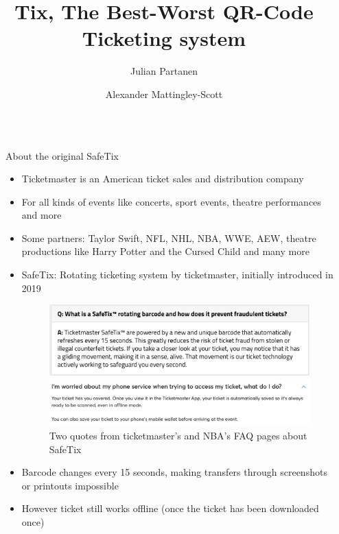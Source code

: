\documentclass[final,dvipsnames]{beamer}
\title{\soutverythick{Safe}Tix, The Best-Worst QR-Code Ticketing system}
\author{ Julian Partanen \inst{1} \and Alexander Mattingley-Scott \inst{1}}
\institute[shortinst]{\inst{1} Heidelberg University}
\newlength{\sepwidth}
\newlength{\colwidth}
\newcommand{\separatorcolumn}{\begin{column}{\sepwidth}\end{column}}
\begin{document}
\begin{frame}[t, fragile]
\begin{columns}[t]
\separatorcolumn

\begin{column}{\colwidth}

    \begin{block}{About the original SafeTix}
        \begin{itemize}
            \item Ticketmaster is an American ticket sales and distribution company \cite{ticketmaster_wikipedia}
            \item For all kinds of events like concerts, sport events, theatre performances and more \cite{ticketmaster_wikipedia}
            \item Some partners: Taylor Swift, NFL, NHL, NBA, WWE, AEW, theatre productions like Harry Potter and the Cursed Child and many more \cite{ticketmaster_wikipedia}
            \item SafeTix: Rotating ticketing system by ticketmaster, initially introduced in 2019 \cite{introducing_safetix} \cite{ticketmaster_safetix_faq} \cite{nba_safetix_faq}
            \begin{figure}[h]
                \begin{center}
                    \includegraphics[width=\textwidth]{figures/SafeTix_Quote_1.png}
                \end{center}
                \begin{center}
                    \includegraphics[width=\textwidth]{figures/SafeTix_Quote_2.png}
                \end{center}
                \caption{Two quotes from ticketmaster's and NBA's FAQ pages about SafeTix \cite{ticketmaster_safetix_faq} \cite{nba_safetix_faq}}
                \label{fig:safetix_quotes}
            \end{figure}
            \item Barcode changes every 15 seconds, making transfers through screenshots or printouts impossible \cite{nba_safetix_faq}
            \item However ticket still works offline (once the ticket has been downloaded once) \cite{ticketmaster_safetix_faq}
        \end{itemize}


\end{block}
\end{column}
\end{columns}
\end{frame}
\end{document}
